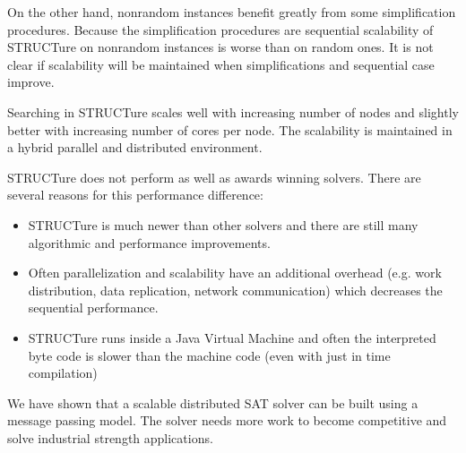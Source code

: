 On the other hand, nonrandom instances benefit greatly from some
simplification procedures. Because the simplification procedures
are sequential scalability of STRUCTure on nonrandom instances is
worse than on random ones. It is not clear if scalability will
be maintained when simplifications and sequential case improve.

Searching in STRUCTure scales well with increasing number of nodes
and slightly better with increasing number of cores per node.
The scalability is maintained in a hybrid parallel and distributed
environment.

STRUCTure does not perform as well as awards winning solvers.
There are several reasons for this performance difference:
\begin{itemize}
  \item STRUCTure is much newer than other solvers and there are
  still many algorithmic and performance improvements.
  \item Often parallelization and scalability have an additional
  overhead (e.g. work distribution, data replication, network
  communication) which decreases the sequential performance.
  \item STRUCTure runs inside a Java Virtual Machine and often
  the interpreted byte code is slower than the machine code (even with just
  in time compilation)
\end{itemize}


We have shown that a scalable distributed SAT solver can be built
using a message passing model. The solver needs more work to become
competitive and solve industrial strength applications.
